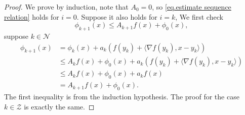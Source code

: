 \documentclass{article}
\theoremstyle{plain}
\theoremstyle{definition}
\theoremstyle{remark}
\begin{document}
\begin{proof}
    We prove by induction, note that $A_0 = 0$, so \eqref{eq.estimate sequence relation} holds for $i=0$. Suppose it also holds for $i=k$,
    We first check
    $$\phi_{k+1}(x)\leq A_{k+1} f(x)+\phi_0(x),$$
    suppose $k\in \mathcal{N}$
    \begin{equation*}
        \begin{aligned}
            \phi_{k+1}(x) & =\phi_k(x)+a_k\left (f(y_k)+\langle \nabla f(y_k),x-y_k\rangle \right)               \\
                          & \leq A_k f(x)+\phi_0(x) +a_k\left (f(y_k)+\langle \nabla f(y_k),x-y_k\rangle \right) \\
                          & \leq A_k f(x)+\phi_0(x) +a_k f(x)                                                    \\
                          & =A_{k+1} f(x)+\phi_0(x).
        \end{aligned}
    \end{equation*}
    The first inequality is from the induction hypothesis. The proof for the case $k\in \mathcal{Z}$ is exactly the same.


\end{proof}
\end{document}

